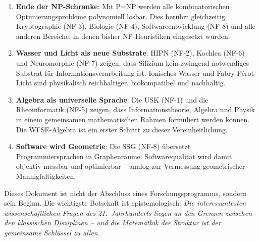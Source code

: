 ﻿\documentclass[a4paper,12pt]{scrreprt}
\theoremstyle{definition}
\begin{document}
\begin{enumerate}
  \item \textbf{Ende der NP-Schranke}: Mit P=NP werden alle
    kombinatorischen Optimierungsprobleme polynomiell lösbar.
    Dies berührt gleichzeitig Kryptographie (NF-3),
    Biologie (NF-4), Softwareentwicklung (NF-8) und alle
    anderen Bereiche, in denen bisher NP-Heuristiken
    eingesetzt wurden.
  \item \textbf{Wasser und Licht als neue Substrate}: HIPN (NF-2),
    Kochlea (NF-6) und Neuromorphie (NF-7) zeigen, dass
    Silizium kein zwingend notwendiges Substrat für
    Informationsverarbeitung ist. Ionisches Wasser und
    Fabry-Pérot-Licht sind physikalisch reichhaltiger,
    biokompatibel und nachhaltig.
  \item \textbf{Algebra als universelle Sprache}: Die USK (NF-1)
    und die Rheoinformatik (NF-5) zeigen, dass
    Informationstheorie, Algebra und Physik in einem
    gemeinsamen mathematischen Rahmen formuliert werden können.
    Die WFSE-Algebra ist ein erster Schritt zu dieser
    Vereinheitlichung.
  \item \textbf{Software wird Geometrie}: Die SSG (NF-8) übersetzt
    Programmiersprachen in Graphenräume. Softwarequalität
    wird damit objektiv messbar und optimierbar -- analog zur
    Vermessung geometrischer Mannigfaltigkeiten.
\end{enumerate}

\bigskip
\noindent
Dieses Dokument ist nicht der Abschluss eines Forschungsprogramms,
sondern sein Beginn. Die wichtigste Botschaft ist epistemologisch:
\emph{Die interessantesten wissenschaftlichen Fragen des 21.~Jahrhunderts
liegen an den Grenzen zwischen den klassischen Disziplinen -- und
die Matemathik der Struktur ist der gemeinsame Schlüssel zu allen.}
\end{document}

